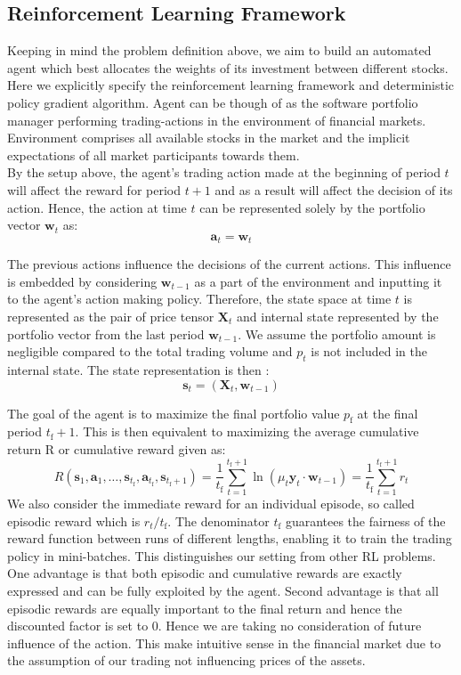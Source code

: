 \documentclass{article}
\begin{document}
\subsection{Reinforcement Learning Framework}

Keeping in mind the problem definition above, we aim to build an automated agent which best allocates the weights of its investment between different stocks. Here we explicitly specify the reinforcement learning framework and deterministic policy gradient algorithm. Agent can be though of as the software portfolio manager performing trading-actions in the environment of financial markets. Environment comprises all available stocks in the market and the implicit expectations of all market participants towards them. \\

By the setup above, the agent's trading action made at the beginning of period $t$ will affect the reward for period $t+1$ and as a result will affect the decision of its action. Hence, the action at time $t$ can be represented solely by the portfolio vector $\bm{w}_t$ as: 
\[ \bm{a}_t = \bm{w}_t\]

The previous actions influence the decisions of the current actions. This influence is embedded by considering $\bm{w}_{t-1}$ as a part of the environment and inputting it to the agent's action making policy. Therefore, the state space at time $t$ is represented as the pair of price tensor $\bm{X}_t$ and internal state represented by the portfolio vector from the last period $\bm{w}_{t-1}$. We assume the portfolio amount is negligible compared to the total trading volume and $p_t$ is not included in the internal state. The state representation is then :
\[ \bm{s}_t = (\bm{X}_t, \bm{w}_{t-1}) \]

The goal of the agent is to maximize the final portfolio value $p_\text{f}$ at the final period $t_\text{f}+1$. This is then equivalent to maximizing the average cumulative return R or cumulative reward given as:
\[ R(\bm{s}_1,\bm{a}_1,\ldots,\bm{s}_{t_\text{f}}, \bm{a}_{t_\text{f}}, \bm{s}_{t_\text{f}+1} ) = \frac{1}{t_\text{f}} \sum_{t=1}^{t_\text{f}+1} \ln (\mu_t \bm{y}_t \cdot \bm{w}_{t-1}) = \frac{1}{t_\text{f}} \sum_{t=1}^{t_\text{f}+1} r_t \]
We also consider the immediate reward for an individual episode, so called episodic reward which is $r_t / t_\text{f}$. The denominator $t_\text{f}$ guarantees the fairness of the reward function between runs of different lengths, enabling it to train the trading policy in mini-batches. This distinguishes our setting from other RL problems. One advantage is that both episodic and cumulative rewards are exactly expressed and can be fully exploited by the agent. Second advantage is that all episodic rewards are equally important to the final return and hence the discounted factor is set to 0. Hence we are taking no consideration of future influence of the action. This make intuitive sense in the financial market due to the assumption of our trading not influencing prices of the assets.
\end{document}
